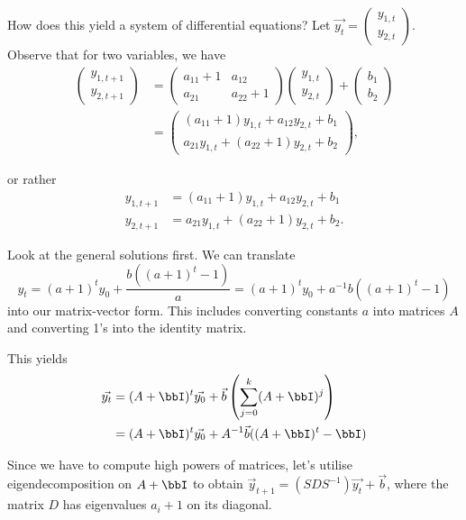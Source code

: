 \documentclass[a4paper, 12pt,oneside,openany]{book}
\begin{document}
How does this yield a system of differential equations? Let $\vec{y_t} = \begin{pmatrix} y_{1, t} \\ y_{2, t} \end{pmatrix}.$ Observe that for two variables, we have \begin{align*} \begin{pmatrix} y_{1, t+1} \\ y_{2, t+1} \end{pmatrix}  &= \begin{pmatrix} a_{11}+1 & a_{12} \\ a_{21} & a_{22}+1 \end{pmatrix} \begin{pmatrix} y_{1, t} \\ y_{2, t} \end{pmatrix} + \begin{pmatrix} b_1 \\ b_2 \end{pmatrix} \\ &=\begin{pmatrix} (a_{11}+1)y_{1, t}+a_{12} y_{2, t}+b_1 \\ a_{21}y_{1, t}+(a_{22}+1)y_{2, t} +b_2\end{pmatrix},\end{align*}

or rather \begin{align*} y_{1, t+1} &= (a_{11}+1)y_{1, t} + a_{12} y_{2, t} + b_1 \\ y_{2, t+1} &= a_{21}y_{1, t} + (a_{22}+1) y_{2, t}+b_2. \end{align*}

Look at the general solutions first. We can translate $$y_t =(a+1)^t y_0+ \frac{b((a+1)^t-1)}{a} = (a+1)^t y_0+ a^{-1}b((a+1)^t-1)$$ into our matrix-vector form. This includes converting constants $a$ into matrices $A$ and converting 1's into the identity matrix.

This yields \begin{align*} \vec{y_t} &= (A+\bbI)^t \vec{y_0} +  \vec{b}\left(\sum\limits_{j=0}^k (A+\bbI)^j \right) \\ &= (A+\bbI)^t \vec{y_0} + A^{-1}\vec{b}((A+\bbI)^t-\bbI) \end{align*}

Since we have to compute high powers of matrices, let's utilise eigendecomposition on $A+\bbI$ to obtain $\vec{y}_{t+1}=(SDS^{-1})\vec{y_t}+\vec{b}$, where the matrix $D$ has eigenvalues $a_i+1$ on its diagonal.
\end{document}
